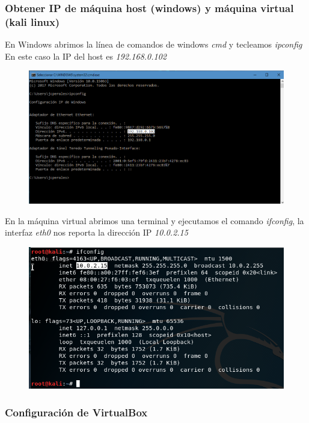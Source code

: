 \documentclass{article}
\begin{document}
\subsubsection{Obtener IP de m\'aquina host (windows) y m\'aquina virtual (kali linux)}
En Windows abrimos la l\'inea de comandos de windows \emph{cmd} y tecleamos \emph{ipconfig}
En este caso la IP del host es \emph{192.168.0.102}

\begin{figure}[H]
\centering
\includegraphics[width=1\textwidth]{01-IPCONFIG}
\end{figure}

En la m\'aquina virtual abrimos una terminal y ejecutamos el comando \emph{ifconfig}, la interfaz \emph{eth0} nos reporta la direcci\'on IP \emph{10.0.2.15}

\begin{figure}[H]
\centering
\includegraphics[width=1\textwidth]{02-IFCONFIG}
\end{figure}


\subsubsection{Configuraci\'on de VirtualBox}
\end{document}
